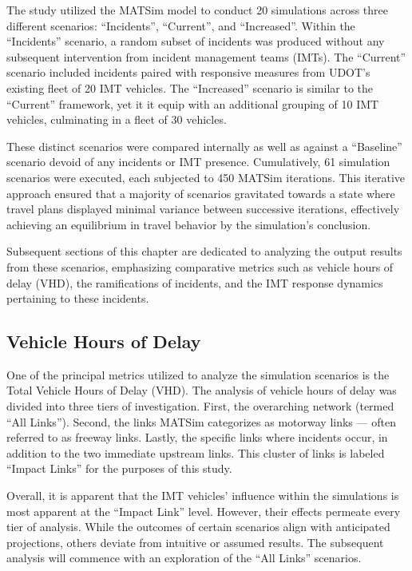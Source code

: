 \documentclass[
  letterpaper,
  authoryear]{elsarticle}
\begin{document}
The study utilized the MATSim model to conduct 20 simulations across
three different scenarios: ``Incidents'', ``Current'', and
``Increased''. Within the ``Incidents'' scenario, a random subset of
incidents was produced without any subsequent intervention from incident
management teams (IMTs). The ``Current'' scenario included incidents
paired with responsive measures from UDOT's existing fleet of 20 IMT
vehicles. The ``Increased'' scenario is similar to the ``Current''
framework, yet it it equip with an additional grouping of 10 IMT
vehicles, culminating in a fleet of 30 vehicles.

These distinct scenarios were compared internally as well as against a
``Baseline'' scenario devoid of any incidents or IMT presence.
Cumulatively, 61 simulation scenarios were executed, each subjected to
450 MATSim iterations. This iterative approach ensured that a majority
of scenarios gravitated towards a state where travel plans displayed
minimal variance between successive iterations, effectively achieving an
equilibrium in travel behavior by the simulation's conclusion.

Subsequent sections of this chapter are dedicated to analyzing the
output results from these scenarios, emphasizing comparative metrics
such as vehicle hours of delay (VHD), the ramifications of incidents,
and the IMT response dynamics pertaining to these incidents.

\hypertarget{vehicle-hours-of-delay}{%
\subsection{Vehicle Hours of Delay}\label{vehicle-hours-of-delay}}

One of the principal metrics utilized to analyze the simulation
scenarios is the Total Vehicle Hours of Delay (VHD). The analysis of
vehicle hours of delay was divided into three tiers of investigation.
First, the overarching network (termed ``All Links''). Second, the links
MATSim categorizes as motorway links --- often referred to as freeway
links. Lastly, the specific links where incidents occur, in addition to
the two immediate upstream links. This cluster of links is labeled
``Impact Links'' for the purposes of this study.

Overall, it is apparent that the IMT vehicles' influence within the
simulations is most apparent at the ``Impact Link'' level. However,
their effects permeate every tier of analysis. While the outcomes of
certain scenarios align with anticipated projections, others deviate
from intuitive or assumed results. The subsequent analysis will commence
with an exploration of the ``All Links'' scenarios.
\end{document}
